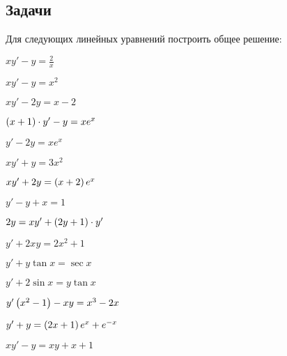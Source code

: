 \subsection{Задачи}
	
	Для следующих линейных уравнений построить общее решение:
	\begin{multicols}{3}
		\begin{enumtasks}

			\label{firstorder:linear}
			\item \( xy' - y = \frac{2}{x} \) 																%
			\item \( xy' - y = x^2 \) 																		%
			\item \( xy' - 2y = x - 2 \) 																	%
			\item \( \left( x + 1 \right) \cdot y' - y = x e^{x} \) 												%
			\item \( y' - 2y = x e^{x} \) 																	%
			\item \( xy' + y = 3x^2 \) 																		%
			\item \( xy' + 2y = \left( x + 2 \right) e^{x} \) 														%
			\item \( y' - y + x = 1 \) 																		%
			\item \( 2y = xy' + \left( 2y + 1 \right) \cdot y' \)													%
			\item \( y' + 2xy = 2x^2 + 1 \) 																%
			\item \( y' + y \tan{x} = \sec{x} \) 															%
			\item \( y' + 2 \sin{x} = y \tan{x} \) 															%
			\item \( y' \left( x^2 - 1 \right) - xy = x^3 - 2x \) 													%
			\item \( y' + y = \left( 2x + 1 \right) e^{x} + e^{-x} \) 												%
			\item \( xy' - y = xy + x + 1 \) 																%

		\end{enumtasks}
	\end{multicols}

